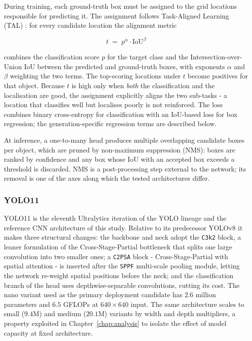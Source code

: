 During training, each ground-truth box must be assigned to the grid locations
responsible for predicting it. The assignment follows Task-Aligned Learning
(TAL) \cite{Feng2021tood}: for every candidate location the alignment metric

\begin{equation}
  t \;=\; p^{\alpha} \cdot \mathrm{IoU}^{\beta}
  \label{eq:p1-tal}
\end{equation}

combines the classification score $p$ for the target class and the
Intersection-over-Union $\mathrm{IoU}$ between the predicted and ground-truth
boxes, with exponents $\alpha$ and $\beta$ weighting the two terms. The
top-scoring locations under $t$ become positives for that object. Because $t$
is high only when \emph{both} the classification and the localisation are good,
the assignment explicitly aligns the two sub-tasks - a location that classifies
well but localises poorly is not reinforced. The loss combines binary
cross-entropy for classification with an IoU-based loss for box regression; the
generation-specific regression terms are described below.

At inference, a one-to-many head produces multiple overlapping candidate boxes
per object, which are pruned by non-maximum suppression (NMS): boxes are ranked
by confidence and any box whose IoU with an accepted box exceeds a threshold is
discarded. NMS is a post-processing step external to the network; its removal
is one of the axes along which the tested architectures differ.

\subsubsection{YOLO11}

YOLO11 \cite{Jocher2024yolo11} is the eleventh Ultralytics iteration of the
YOLO lineage \cite{Redmon2016} and the reference CNN architecture of this
study. Relative to its predecessor YOLOv8 it makes three structural changes:
the backbone and neck adopt the \texttt{C3k2} block, a leaner formulation of
the Cross-Stage-Partial bottleneck that splits one large convolution into two
smaller ones; a \texttt{C2PSA} block - Cross-Stage-Partial with spatial
attention - is inserted after the \texttt{SPPF} multi-scale pooling module,
letting the network re-weight spatial positions before the neck; and the
classification branch of the head uses depthwise-separable convolutions,
cutting its cost. The nano variant used as the primary deployment candidate has
$2.6$ million parameters and $6.5$ GFLOPs at $640 \times 640$ input. The same
architecture scales to small ($9.4$M) and medium ($20.1$M) variants by width
and depth multipliers, a property exploited in Chapter~\ref{chap:analysis} to
isolate the effect of model capacity at fixed architecture.

